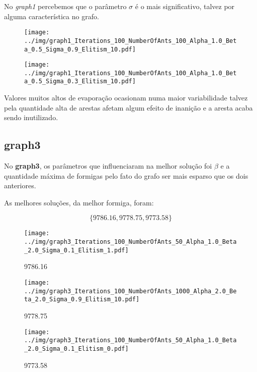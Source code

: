 No \textit{graph1} percebemos que o parâmetro $\sigma$ é o mais significativo, talvez por alguma característica no grafo.

\begin{figure}[H]
  \centering
  \texttt{[image: ../img/graph1\_Iterations\_100\_NumberOfAnts\_100\_Alpha\_1.0\_Beta\_0.5\_Sigma\_0.9\_Elitism\_10.pdf]}
\end{figure}

\begin{figure}[H]
  \centering
  \texttt{[image: ../img/graph1\_Iterations\_100\_NumberOfAnts\_100\_Alpha\_1.0\_Beta\_0.5\_Sigma\_0.3\_Elitism\_10.pdf]}
\end{figure}

Valores muitos altos de evaporação ocasionam numa maior variabilidade talvez pela quantidade alta de arestas
afetam algum efeito de inanição e a aresta acaba sendo inutilizado.

\subsection{\textbf{graph3}}

No \textbf{graph3}, os parâmetros que influenciaram na melhor solução foi $\beta$ e a quantidade máxima de formigas
pelo fato do grafo ser mais esparso que os dois anteriores.

As melhores soluções, da melhor formiga, foram:

\[\{ 9786.16,9778.75,9773.58\} \]

\begin{figure}[H]
  \centering
  \texttt{[image: ../img/graph3\_Iterations\_100\_NumberOfAnts\_50\_Alpha\_1.0\_Beta\_2.0\_Sigma\_0.1\_Elitism\_1.pdf]}
  \caption{9786.16}
\end{figure}

\begin{figure}[H]
  \centering
  \texttt{[image: ../img/graph3\_Iterations\_100\_NumberOfAnts\_1000\_Alpha\_2.0\_Beta\_2.0\_Sigma\_0.9\_Elitism\_10.pdf]}
  \caption{9778.75}
\end{figure}

\begin{figure}[H]
  \centering
  \texttt{[image: ../img/graph3\_Iterations\_100\_NumberOfAnts\_50\_Alpha\_1.0\_Beta\_2.0\_Sigma\_0.1\_Elitism\_0.pdf]}
  \caption{9773.58}
\end{figure}
